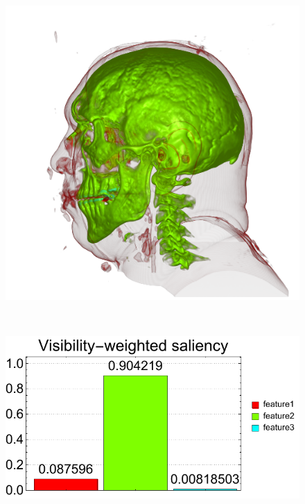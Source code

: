 \begin{figure}
	\centering
	\begin{minipage}{.24\textwidth}
		\includegraphics[width=1\linewidth]{images/vismale_weak_red}
		\subcaption{}
	\end{minipage}~
	\begin{minipage}{.25\textwidth}
		\includegraphics[width=1\linewidth]{figures/vismale_weak_red_visibility_saliency_weighted_chart}
		\subcaption{}
	\end{minipage}~
	\begin{minipage}{.24\textwidth}

\end{minipage}
\end{figure}

